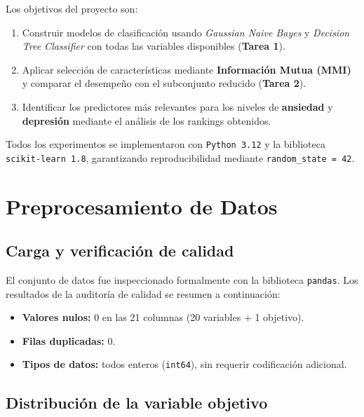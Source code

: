 \documentclass[12pt, letterpaper]{article}
\begin{document}
Los objetivos del proyecto son:

\begin{enumerate}
    \item Construir modelos de clasificación usando \textit{Gaussian Naive Bayes}
          y \textit{Decision Tree Classifier} con todas las variables disponibles
          (\textbf{Tarea 1}).
    \item Aplicar selección de características mediante \textbf{Información Mutua
          (MMI)} y comparar el desempeño con el subconjunto reducido
          (\textbf{Tarea 2}).
    \item Identificar los predictores más relevantes para los niveles de
          \textbf{ansiedad} y \textbf{depresión} mediante el análisis de los
          rankings obtenidos.
\end{enumerate}

Todos los experimentos se implementaron con \texttt{Python 3.12} y la
biblioteca \texttt{scikit-learn 1.8}, garantizando reproducibilidad mediante
\texttt{random\_state = 42}.

\section{Preprocesamiento de Datos}

\subsection{Carga y verificación de calidad}

El conjunto de datos fue inspeccionado formalmente con la biblioteca
\texttt{pandas}. Los resultados de la auditoría de calidad se resumen a
continuación:

\begin{itemize}
    \item \textbf{Valores nulos:} 0 en las 21 columnas (20 variables +
          1 objetivo).
    \item \textbf{Filas duplicadas:} 0.
    \item \textbf{Tipos de datos:} todos enteros (\texttt{int64}), sin
          requerir codificación adicional.
\end{itemize}

\subsection{Distribución de la variable objetivo}
\end{document}
